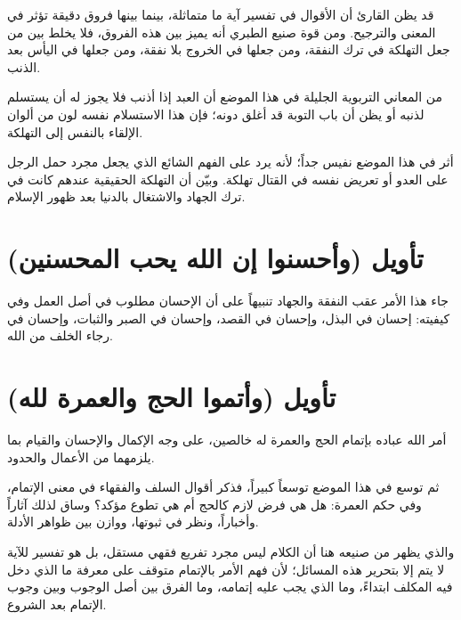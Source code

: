 \begin{fawaid}
قد يظن القارئ أن الأقوال في تفسير آية ما متماثلة، بينما بينها فروق دقيقة تؤثر في المعنى والترجيح. ومن قوة صنيع الطبري أنه يميز بين هذه الفروق، فلا يخلط بين من جعل التهلكة في ترك النفقة، ومن جعلها في الخروج بلا نفقة، ومن جعلها في اليأس بعد الذنب.
\end{fawaid}

\begin{fawaid}
من المعاني التربوية الجليلة في هذا الموضع أن العبد إذا أذنب فلا يجوز له أن يستسلم لذنبه أو يظن أن باب التوبة قد أغلق دونه؛ فإن هذا الاستسلام نفسه لون من ألوان الإلقاء بالنفس إلى التهلكة.
\end{fawaid}

\begin{fawaid}
أثر  في هذا الموضع نفيس جداً؛ لأنه يرد على الفهم الشائع الذي يجعل مجرد حمل الرجل على العدو أو تعريض نفسه في القتال تهلكة. وبيّن أن التهلكة الحقيقية عندهم كانت في ترك الجهاد والاشتغال بالدنيا بعد ظهور الإسلام.
\end{fawaid}

\section{تأويل (وأحسنوا إن الله يحب المحسنين)}
جاء هذا الأمر عقب النفقة والجهاد تنبيهاً على أن الإحسان مطلوب في أصل العمل وفي كيفيته: إحسان في البذل، وإحسان في القصد، وإحسان في الصبر والثبات، وإحسان في رجاء الخلف من الله.

\separator

\section{تأويل (وأتموا الحج والعمرة لله)}
 أمر الله عباده بإتمام الحج والعمرة له خالصين، على وجه الإكمال والإحسان والقيام بما يلزمهما من الأعمال والحدود.

ثم توسع  في هذا الموضع توسعاً كبيراً، فذكر أقوال السلف والفقهاء في معنى الإتمام، وفي حكم العمرة: هل هي فرض لازم كالحج أم هي تطوع مؤكد؟ وساق لذلك آثاراً وأخباراً، ونظر في ثبوتها، ووازن بين ظواهر الأدلة.

والذي يظهر من صنيعه هنا أن الكلام ليس مجرد تفريع فقهي مستقل، بل هو تفسير للآية لا يتم إلا بتحرير هذه المسائل؛ لأن فهم الأمر بالإتمام متوقف على معرفة ما الذي دخل فيه المكلف ابتداءً، وما الذي يجب عليه إتمامه، وما الفرق بين أصل الوجوب وبين وجوب الإتمام بعد الشروع.

